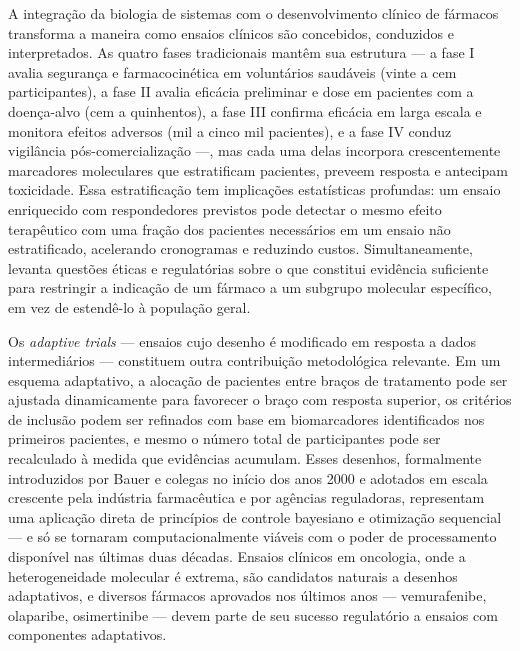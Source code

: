 A integração da biologia de sistemas com o desenvolvimento clínico de fármacos transforma a maneira como ensaios clínicos são concebidos, conduzidos e interpretados. As quatro fases tradicionais mantêm sua estrutura --- a fase I avalia segurança e farmacocinética em voluntários saudáveis (vinte a cem participantes), a fase II avalia eficácia preliminar e dose em pacientes com a doença-alvo (cem a quinhentos), a fase III confirma eficácia em larga escala e monitora efeitos adversos (mil a cinco mil pacientes), e a fase IV conduz vigilância pós-comercialização ---, mas cada uma delas incorpora crescentemente marcadores moleculares que estratificam pacientes, preveem resposta e antecipam toxicidade. Essa estratificação tem implicações estatísticas profundas: um ensaio enriquecido com respondedores previstos pode detectar o mesmo efeito terapêutico com uma fração dos pacientes necessários em um ensaio não estratificado, acelerando cronogramas e reduzindo custos. Simultaneamente, levanta questões éticas e regulatórias sobre o que constitui evidência suficiente para restringir a indicação de um fármaco a um subgrupo molecular específico, em vez de estendê-lo à população geral.

Os \emph{adaptive trials} --- ensaios cujo desenho é modificado em resposta a dados intermediários --- constituem outra contribuição metodológica relevante. Em um esquema adaptativo, a alocação de pacientes entre braços de tratamento pode ser ajustada dinamicamente para favorecer o braço com resposta superior, os critérios de inclusão podem ser refinados com base em biomarcadores identificados nos primeiros pacientes, e mesmo o número total de participantes pode ser recalculado à medida que evidências acumulam. Esses desenhos, formalmente introduzidos por Bauer e colegas no início dos anos 2000 e adotados em escala crescente pela indústria farmacêutica e por agências reguladoras, representam uma aplicação direta de princípios de controle bayesiano e otimização sequencial --- e só se tornaram computacionalmente viáveis com o poder de processamento disponível nas últimas duas décadas. Ensaios clínicos em oncologia, onde a heterogeneidade molecular é extrema, são candidatos naturais a desenhos adaptativos, e diversos fármacos aprovados nos últimos anos --- vemurafenibe, olaparibe, osimertinibe --- devem parte de seu sucesso regulatório a ensaios com componentes adaptativos.

